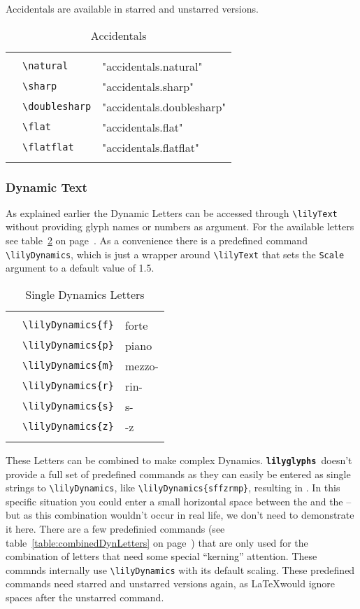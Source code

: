 \documentclass{article}
\newcommand{\lilyglyphs}{\texttt{\textbf{lilyglyphs\,}}}
\newcommand*{\cmd}[1]{\texttt{\textbackslash #1}}
\newcommand{\tmpCaption}{} %
\newcommand{\tmpLabel}{}
\newenvironment{reftable}[2]
	{%
		\renewcommand{\tmpCaption}{#1}
		\renewcommand{\tmpLabel}{#2}
		\begin{table}[ht]
		\begin{center}
		\begin{tabular}[t]{lll}
		\hline
		&\\
	}
	{%
		&\\
		\hline
		\end{tabular}
		\caption{\tmpCaption}
		\label{table:\tmpLabel}
		\end{center}
		\end{table}
	}
\begin{document}
Accidentals are available in starred and unstarred versions.

\begin{reftable}{Accidentals}{accidentals}
\natural & \cmd{natural} & "accidentals.natural"\\
\sharp & \cmd{sharp} & "accidentals.sharp"\\
\doublesharp & \cmd{doublesharp} & "accidentals.doublesharp"\\
\flat & \cmd{flat} & "accidentals.flat"\\
\flatflat & \cmd{flatflat} & "accidentals.flatflat"\\
\end{reftable}



\subsubsection{Dynamic Text}
As explained earlier the Dynamic Letters can be accessed through \cmd{lilyText} without providing glyph names or numbers as argument. 
For the available letters see table~\ref{table:singleDynLetters} on page~\pageref{table:singleDynLetters}. 
As a convenience there is a predefined command \cmd{lilyDynamics}, which is just a wrapper around \cmd{lilyText} that sets the \texttt{Scale} argument to a default value of 1.5.

\begin{reftable}{Single Dynamics Letters}{singleDynLetters}
\lilyDynamics{f} & \cmd{lilyDynamics\{f\}} & forte\\
\lilyDynamics{p} & \cmd{lilyDynamics\{p\}} & piano\\
\lilyDynamics{m} & \cmd{lilyDynamics\{m\}} & mezzo-\\
\lilyDynamics{r} & \cmd{lilyDynamics\{r\}} & rin-\\
\lilyDynamics{s} & \cmd{lilyDynamics\{s\}} & s-\\
\lilyDynamics{z} & \cmd{lilyDynamics\{z\}} & -z\\
\end{reftable}

These Letters can be combined to make complex Dynamics. 
\lilyglyphs doesn't provide a full set of predefined commands as they can easily be entered as single strings to \cmd{lilyDynamics}, like \cmd{lilyDynamics\{sffzrmp\}}, resulting in . 
In this specific situation you could enter a small horizontal space between the  and the  -- but as this combination wouldn't occur in real life, we don't need to demonstrate it here.
There are a few predefinied commands (see table~\ref{table:combinedDynLetters} on page~\pageref{table:combinedDynLetters}) that are only used for the combination of letters that need some special \enquote{kerning} attention. These commnds internally use \cmd{lilyDynamics} with its default scaling. These predefined commands need starred and unstarred versions again, as \LaTeX would ignore spaces after the unstarred command.
\end{document}
